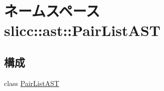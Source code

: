 \hypertarget{namespaceslicc_1_1ast_1_1PairListAST}{
\section{ネームスペース slicc::ast::PairListAST}
\label{namespaceslicc_1_1ast_1_1PairListAST}
}
\subsection*{構成}
\begin{DoxyCompactItemize}
\item 
class \hyperlink{classslicc_1_1ast_1_1PairListAST_1_1PairListAST}{PairListAST}
\end{DoxyCompactItemize}
